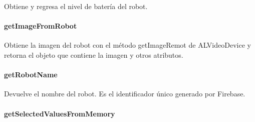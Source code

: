 \begin{fulllineitems}
\label{\detokenize{dev_docs:com.lar.cloudnao.Robot.getBatteryLevel()}}
Obtiene y regresa el nivel de batería del robot.

\end{fulllineitems}



\paragraph{getImageFromRobot}
\label{\detokenize{dev_docs:id36}}

\begin{fulllineitems}
\label{\detokenize{dev_docs:com.lar.cloudnao.Robot.getImageFromRobot()}}
Obtiene la imagen del robot con el método getImageRemot de ALVideoDevice y retorna el objeto que contiene la imagen y otros atributos.

\end{fulllineitems}



\paragraph{getRobotName}
\label{\detokenize{dev_docs:getrobotname}}

\begin{fulllineitems}
\label{\detokenize{dev_docs:com.lar.cloudnao.Robot.getRobotName()}}
Devuelve el nombre del robot. Es el identificador único generado por Firebase.

\end{fulllineitems}



\paragraph{getSelectedValuesFromMemory}
\label{\detokenize{dev_docs:getselectedvaluesfrommemory}}

